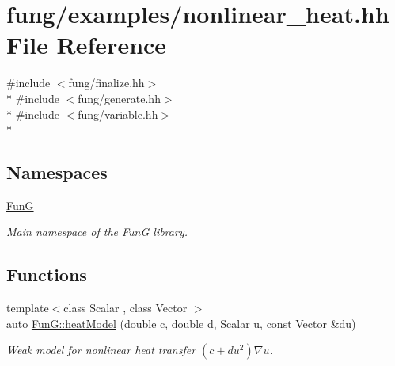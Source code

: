 \hypertarget{nonlinear__heat_8hh}{}\section{fung/examples/nonlinear\+\_\+heat.hh File Reference}
\label{nonlinear__heat_8hh}
{\ttfamily \#include $<$fung/finalize.\+hh$>$}\\*
{\ttfamily \#include $<$fung/generate.\+hh$>$}\\*
{\ttfamily \#include $<$fung/variable.\+hh$>$}\\*
\subsection*{Namespaces}
\begin{DoxyCompactItemize}
\item 
 \hyperlink{namespaceFunG}{FunG}
\begin{DoxyCompactList}\small\item\em Main namespace of the FunG library. \end{DoxyCompactList}\end{DoxyCompactItemize}
\subsection*{Functions}
\begin{DoxyCompactItemize}
\item 
{\footnotesize template$<$class Scalar , class Vector $>$ }\\auto \hyperlink{namespaceFunG_aab17a1468e61f58564333b3fcd7900d6}{Fun\+G\+::heat\+Model} (double c, double d, Scalar u, const Vector \&du)
\begin{DoxyCompactList}\small\item\em Weak model for nonlinear heat transfer $ (c+du^2)\nabla u $. \end{DoxyCompactList}\end{DoxyCompactItemize}
